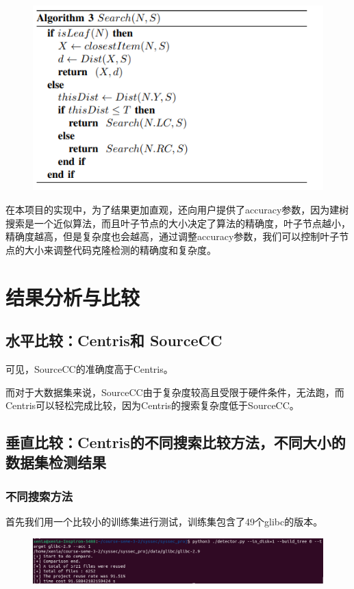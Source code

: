 \documentclass{cjc}
\begin{document}
\begin{figure}[htb]
  \centering
  \includegraphics[width=\linewidth]{pics/image-20220622213044543.png}
\end{figure}


在本项目的实现中，为了结果更加直观，还向用户提供了accuracy参数，因为建树搜索是一个近似算法，而且叶子节点的大小决定了算法的精确度，叶子节点越小，精确度越高，但是复杂度也会越高，通过调整accuracy参数，我们可以控制叶子节点的大小来调整代码克隆检测的精确度和复杂度。


\section{结果分析与比较}

\subsection{水平比较：Centris和 SourceCC}


可见，SourceCC的准确度高于Centris。

而对于大数据集来说，SourceCC由于复杂度较高且受限于硬件条件，无法跑，而Centris可以轻松完成比较，因为Centris的搜索复杂度低于SourceCC。





\subsection{ 垂直比较：Centris的不同搜索比较方法，不同大小的数据集检测结果}
\subsubsection{ 不同搜索方法}
首先我们用一个比较小的训练集进行测试，训练集包含了49个glibc的版本。
\begin{figure}[htb]
  \centering
  \includegraphics[width=\linewidth]{pics/image-20220622221558771.png}
\end{figure}
\end{document}
